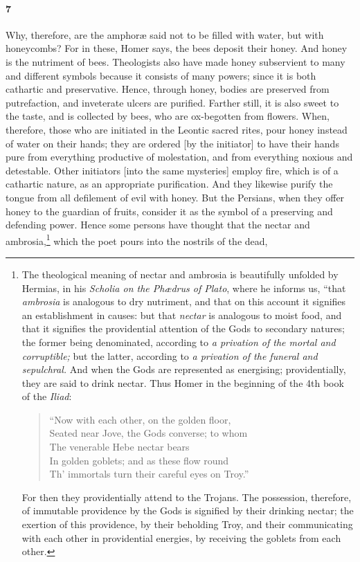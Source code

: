 \documentclass[12pt]{article}
\begin{document}
\paragraph{7} Why, therefore, are the amphor{\ae} said not to be filled with
water, but with honeycombs? For in these, Homer says, the bees deposit their
honey. And honey is the nutriment of bees. Theologists also have made honey
subservient to many and different symbols because it consists of many powers;
since it is both cathartic and preservative. Hence, through honey, bodies are
preserved from putrefaction, and inveterate ulcers are purified. Farther still,
it is also sweet to the taste, and is collected by bees, who are ox-begotten
from flowers. When, therefore, those who are initiated in the Leontic sacred
rites, pour honey instead of water on their hands; they are ordered [by the
initiator] to have their hands pure from everything productive of molestation,
and from everything noxious and detestable. Other initiators [into the same
mysteries] employ fire, which is of a cathartic nature, as an appropriate
purification. And they likewise purify the tongue from all defilement of evil
with honey. But the Persians, when they offer honey to the guardian of fruits,
consider it as the symbol of a preserving and defending power. Hence some
persons have thought that the nectar and ambrosia,\footnote{The theological
meaning of nectar and ambrosia is beautifully unfolded by Hermias, in his
\textit{Scholia on the Ph{\ae}drus of Plato}, where he informs us, ``that
\textit{ambrosia} is analogous to dry nutriment, and that on this account it
signifies an establishment in causes: but that \textit{nectar} is analogous to
moist food, and that it signifies the providential attention of the Gods to
secondary natures; the former being denominated, according to \textit{a
privation of the mortal and corruptible;} but the latter, according to
\textit{a privation of the funeral and sepulchral.} And when the Gods are
represented as energising; providentially, they are said to drink nectar. Thus
Homer in the beginning of the 4th book of the \textit{Iliad}:

\begin{verse}
``Now with each other, on the golden floor,\\
Seated near Jove, the Gods converse; to whom\\
The venerable Hebe nectar bears\\
In golden goblets; and as these flow round\\
Th' immortals turn their careful eyes on Troy.''
\end{verse}

\noindent For then they providentially attend to the Trojans. The possession,
therefore, of immutable providence by the Gods is signified by their drinking
nectar; the exertion of this providence, by their beholding Troy, and their
communicating with each other in providential energies, by receiving the
goblets from each other.} which the poet pours into the nostrils of the dead,
\end{document}
